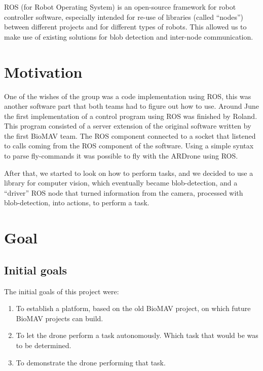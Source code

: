 \documentclass[a4paper,10pt]{article}
\begin{document}
ROS (for Robot Operating System) is an open-source framework for robot
controller software, especially intended for re-use of libraries
(called ``nodes'') between different projects and for different types of
robots. This allowed us to make use of existing solutions for blob
detection and inter-node communication.

\section{Motivation}
One of the wishes of the group was a code implementation using ROS, this was another software part that both teams had to figure out how to use. 
Around June the first implementation of a control program using ROS was finished by Roland. 
This program consisted of a server extension of the original software written by the first BioMAV team.  
The ROS component connected to a socket that listened to calls coming from the ROS component of the software. 
Using a simple syntax to parse fly-commands it was possible to fly with the ARDrone using ROS.  

After that, we started to look on how to perform tasks, and we decided
to use a library for computer vision, which eventually became
blob-detection, and a ``driver'' ROS node that turned information from
the camera, processed with blob-detection, into actions, to perform a
task.

\section{Goal}
\subsection{Initial goals}
The initial goals of this project were:
\begin{enumerate}
\item To establish a platform, based on the old BioMAV project, on which
      future BioMAV projects can build.
\item To let the drone perform a task autonomously. Which task that would be
      was to be determined.
\item To demonstrate the drone performing that task.
\end{enumerate}
\end{document}
